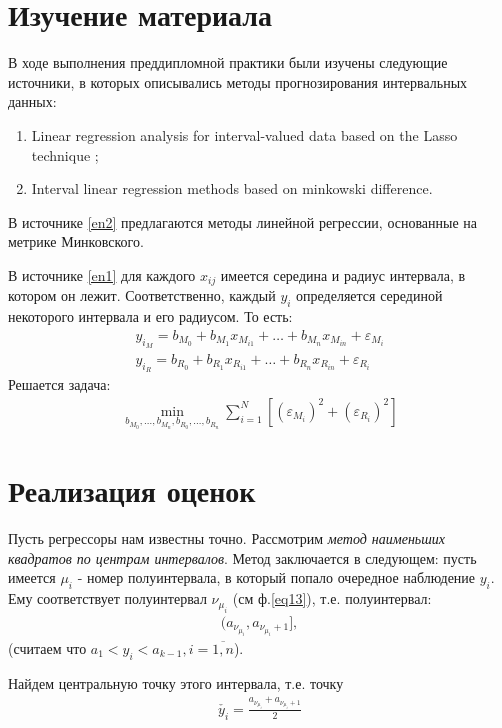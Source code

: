 

\section{Изучение материала}
В ходе выполнения преддипломной практики были изучены следующие источники, в которых описывались методы прогнозирования интервальных данных:
\begin{enumerate}
    \item \label{en1}Linear regression analysis for interval-valued data based on the Lasso technique \cite{interval_valued};
    \item \label{en2}Interval linear regression methods based on minkowski difference. \cite{minkowski}
\end{enumerate}

В источнике \ref{en2} предлагаются методы линейной регрессии, основанные на метрике Минковского.

В источнике \ref{en1} для каждого $x_{ij}$ имеется середина  и радиус интервала, в котором он лежит. Соответственно, каждый $y_i$ определяется серединой некоторого интервала и его радиусом.
То есть:
\begin{eqnarray}
    y_{i_M} = b_{M_0} + b_{M_1} x_{M_{i1}} + \dots + b_{M_n} x_{M_{in}} + \varepsilon_{M_i}\\
    y_{i_R} = b_{R_0} + b_{R_1} x_{R_{i1}} + \dots + b_{R_n} x_{R_{in}} + \varepsilon_{R_i}
\end{eqnarray} 
Решается задача:
\begin{eqnarray}
    \min_{b_{M_0},\dots,b_{M_n},b_{R_0}, \dots, b_{R_n}} \sum\limits_{i=1}^N [(\varepsilon_{M_i})^2 + (\varepsilon_{R_i})^2]
\end{eqnarray}


\newpage
\section{Реализация оценок}
Пусть регрессоры нам известны точно. Рассмотрим \textit{метод наименьших квадратов по центрам интервалов}. 
Метод заключается в следующем:
пусть имеется $\mu_i$ - номер полуинтервала, в который попало очередное наблюдение $y_i$. Ему соответствует полуинтервал $\nu_{\mu_i}$ (см ф.\ref{eq13}), т.е. полуинтервал:
\begin{eqnarray}
    (a_{\nu_{\mu_i}},a_{\nu_{\mu_i}+1}],
\end{eqnarray}
(считаем что $a_1<y_i<a_{k-1}, i=\overline{1,n}$).

Найдем центральную точку этого интервала, т.е. точку
\begin{eqnarray}
    \check{y_i} = \frac{a_{\nu_{\mu_i}} + a_{\nu_{\mu_i}+1}}{2}
\end{eqnarray}

